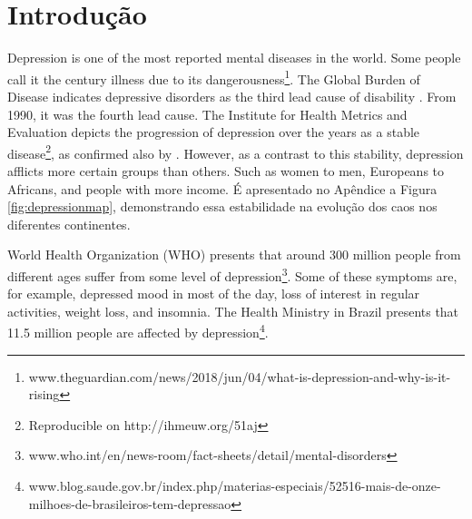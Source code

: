 \documentclass[11pt, notitlepage]{article} %
\begin{document}
\section*{Introdução}

Depression is one of the most reported mental diseases in the world. Some people call it the century illness due to its dangerousness\footnote{www.theguardian.com/news/2018/jun/04/what-is-depression-and-why-is-it-rising}. 
The Global Burden of Disease indicates depressive disorders as the third lead cause of disability \cite{IHME}. From 1990, it was the fourth lead cause. 
The Institute for Health Metrics and Evaluation depicts the progression of depression over the years as a stable disease\footnote{Reproducible on http://ihmeuw.org/51aj}, as confirmed also by \cite{brody2018prevalence}. However, as a contrast to this stability, depression afflicts more certain groups than others. Such as women to men, Europeans to Africans, and people with more income. É apresentado no Apêndice a Figura \ref{fig:depressionmap}, demonstrando essa estabilidade na evolução dos caos nos diferentes continentes.
%

World Health Organization (WHO) presents that around 300 million people from different ages suffer from some level of depression\footnote{www.who.int/en/news-room/fact-sheets/detail/mental-disorders}. 
Some of these symptoms are, for example, depressed mood in most of the day, loss of interest in regular activities, weight loss, and insomnia.
The Health Ministry in Brazil presents that 11.5 million people are affected by depression\footnote{www.blog.saude.gov.br/index.php/materias-especiais/52516-mais-de-onze-milhoes-de-brasileiros-tem-depressao}.

\end{document}
